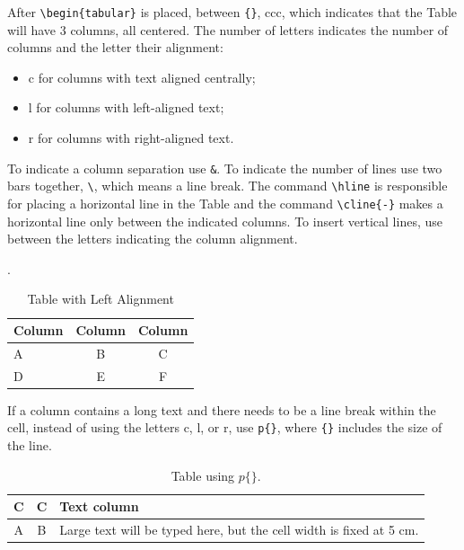 After \verb|\begin{tabular}| is placed, between \verb|{}|, ccc, which indicates that the Table will have 3 columns, all centered. The number of letters indicates the number of columns and the letter their alignment: 
\begin{itemize}
    \item c for columns with text aligned centrally;
    \item l for columns with left-aligned text;
    \item r for columns with right-aligned text.
\end{itemize}\par
To indicate a column separation use \verb|&|. To indicate the number of lines use two
bars together, \verb|\|, which means a line break. The command \verb|\hline| is responsible for placing a horizontal line in the Table and the command \verb|\cline{-}| makes a horizontal line only between the indicated columns. To insert vertical lines, use \verb|| between the letters indicating the column alignment.
\begin{table}[htpb]
    \renewcommand{\arraystretch}{1.5}
    \centering
    \caption{Table with Left Alignment}.
    \label{tab2}
    \begin{tabular}{|l|cc|}
    \hline
    Column & Column & Column \\
    \hline \hline
    A & B & C \\
    \cline{2-3}
    D & E & F \\
    \hline
    \end{tabular}
\end{table}\par 

If a column contains a long text and there needs to be a line break within the cell, instead of using the letters c, l, or r, use \verb|p{}|, where \verb|{}| includes the size of the line.
\begin{table}[htpb]
    \renewcommand{\arraystretch}{1.5}
    \centering
    \caption{Table using $p\{\}$.}
    \label{tab3}
    \begin{tabular}{ccp{5cm}}
    \hline
    C & C & Text column \\
    \hline
    A & B & Large text will be typed here,
    but the cell width is fixed at 5 \si{\cm}.\\
\hline
\end{tabular}
\end{table}


